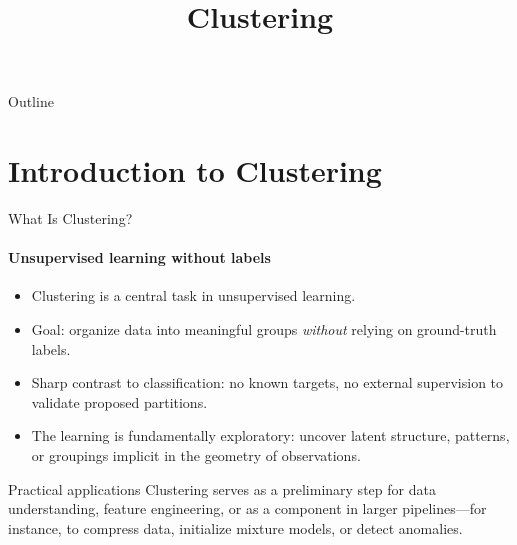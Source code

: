 

%
%
%

\title[Clustering]{Clustering}
%
%

\begin{frame}
  \titlepage
\end{frame}

\begin{frame}{Outline}
  \tableofcontents
\end{frame}

\section{Introduction to Clustering}

\begin{frame}{What Is Clustering?}
  \framesubtitle{Unsupervised learning without labels}
  \begin{itemize}
    \item \alert{Clustering} is a central task in unsupervised learning.
    \item Goal: organize data into meaningful groups \emph{without} relying on ground-truth labels.
    \item Sharp contrast to classification: no known targets, no external supervision to validate
          proposed partitions.
    \item The learning is fundamentally \alert{exploratory}: uncover latent structure, patterns,
          or groupings implicit in the geometry of observations.
  \end{itemize}
  \begin{block}{Practical applications}
    Clustering serves as a preliminary step for data understanding, feature engineering,
    or as a component in larger pipelines---for instance, to compress data, initialize mixture
    models, or detect anomalies.
  \end{block}
\end{frame}

